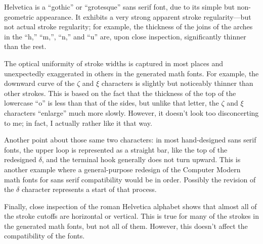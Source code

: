 
Helvetica is a ``gothic'' or ``grotesque'' sans serif font, due to its simple
but non-geometric appearance. It exhibits a very strong apparent stroke
regularity---but not actual stroke regularity; for example, the thickness of the
joins of the arches in the ``h,'' ``m,'', ``n,'' and ``u'' are, upon close
inspection, significantly thinner than the rest.

The optical uniformity of stroke widths is captured in most places and
unexpectedly exaggerated in others in the generated math fonts. For example, the
downward curve of the $\zeta$ and $\xi$ characters is slightly but noticeably
thinner than other strokes. This is based on the fact that the thickness of the
top of the lowercase ``o'' is less than that of the sides, but unlike that
letter, the $\zeta$ and $\xi$ characters ``enlarge'' much more slowly. However,
it doesn't look too disconcerting to me; in fact, I actually rather like it that
way.

Another point about those same two characters: in most hand-designed sans serif
fonts, the upper loop is represented as a straight bar, like the top of the
redesigned $\delta$, and the terminal hook generally does not turn upward. This
is another example where a general-purpose redesign of the Computer Modern math
fonts for sans serif compatibility would be in order. Possibly the revision of
the $\delta$ character represents a start of that process.

Finally, close inspection of the roman Helvetica alphabet shows that almost all
of the stroke cutoffs are horizontal or vertical. This is true for many of the
strokes in the generated math fonts, but not all of them. However, this doesn't
affect the compatibility of the fonts.

